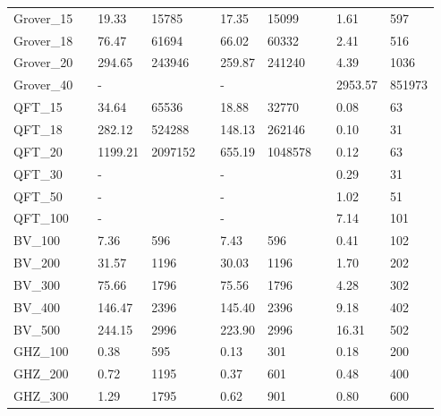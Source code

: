 \documentclass{article}
\begin{document}
\begin{itemize}
\begin{table}[!htbp]
{\begin{tabular}{llllllllll}
                Grover\_15 &   & 19.33  & 15785     &   & 17.35      & 15099  & & 1.61 & 597  \\
                Grover\_18 &   & 76.47  & 61694     &   & 66.02      & 60332  & & 2.41 & 516  \\
                Grover\_20 &   & 294.65 & 243946    &   & 259.87     & 241240 & & 4.39  & 1036 \\ 
                Grover\_40 &   & -      &           &   & -          &        & & 2953.57 & 851973 \\
                \hline
                QFT\_15     &  & 34.64   & 65536   &  & 18.88  & 32770   &  & 0.08 & 63  \\
                QFT\_18     &  & 282.12  & 524288  &  & 148.13 & 262146 &   & 0.10  & 31  \\
                QFT\_20     &  & 1199.21 & 2097152 &  & 655.19 & 1048578 &  & 0.12 & 63  \\
                QFT\_30     &  & -       &         &  & -      &        &  & 0.29 & 31  \\
                QFT\_50     &  & -       &         &  & -      &        &  & 1.02 & 51  \\
                QFT\_100    &  & -       &         &  & -      &        &  & 7.14 & 101 \\
                \hline
                BV\_100     &  & 7.36    & 596     &  & 7.43      & 596     &  & 0.41           & 102 \\
                BV\_200     &  & 31.57   & 1196    &  & 30.03     & 1196    &  & 1.70           & 202 \\
                BV\_300     &  & 75.66   & 1796    &  & 75.56     & 1796    &  & 4.28           & 302 \\
                BV\_400     &  & 146.47  & 2396    &  & 145.40    & 2396    &  & 9.18           & 402 \\
                BV\_500     &  & 244.15  & 2996    &  & 223.90    & 2996    &  & 16.31          & 502 \\
                \hline
                GHZ\_100    &  & 0.38    & 595     &  & 0.13      & 301    &  & 0.18           & 200 \\%
                GHZ\_200    &  & 0.72    & 1195    &  & 0.37      & 601    &  & 0.48           & 400 \\%
                GHZ\_300    &  & 1.29    & 1795    &  & 0.62      & 901    &  & 0.80           & 600 \\%

\end{tabular}}
\end{table}
\end{itemize}
\end{document}
